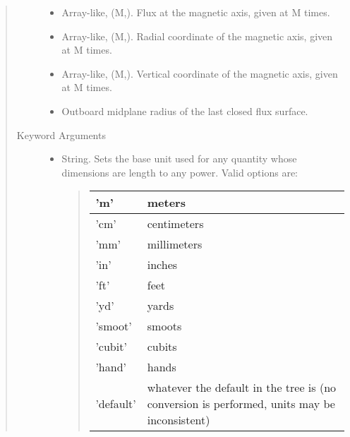 \documentclass[letterpaper,10pt,english]{sphinxmanual}
\begin{document}
\begin{fulllineitems}
\begin{quote}
\begin{description}
\begin{itemize}
\item {} 
 \textendash{} Array-like, (M,).
Flux at the magnetic axis, given at M times.

\item {} 
 \textendash{} Array-like, (M,).
Radial coordinate of the magnetic axis, given at M times.

\item {} 
 \textendash{} Array-like, (M,).
Vertical coordinate of the magnetic axis, given at M times.

\item {} 
 \textendash{} Outboard midplane radius of the last closed flux surface.

\end{itemize}

\item[{Keyword Arguments}] \leavevmode\begin{itemize}
\item {} 
 \textendash{} 
String.
Sets the base unit used for any quantity whose
dimensions are length to any power. Valid options are:
\begin{quote}


\begin{savenotes}\sphinxattablestart
\centering
\begin{tabulary}{\linewidth}[t]{|T|T|}
\hline

’m’
&
meters
\\
\hline
’cm’
&
centimeters
\\
\hline
’mm’
&
millimeters
\\
\hline
’in’
&
inches
\\
\hline
’ft’
&
feet
\\
\hline
’yd’
&
yards
\\
\hline
’smoot’
&
smoots
\\
\hline
’cubit’
&
cubits
\\
\hline
’hand’
&
hands
\\
\hline
’default’
&
whatever the default in the tree is (no conversion is performed, units may be inconsistent)
\\
\hline
\end{tabulary}
\par
\sphinxattableend\end{savenotes}
\end{quote}


\end{itemize}
\end{description}
\end{quote}
\end{fulllineitems}
\end{document}
